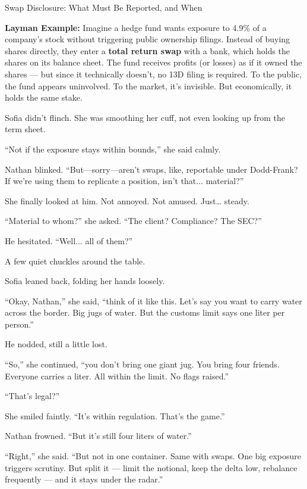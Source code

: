 \begin{TechnicalSidebar}{Swap Disclosure: What Must Be Reported, and When}
    \medskip
    
    \textbf{Layman Example:}  
    Imagine a hedge fund wants exposure to 4.9\% of a company’s stock without triggering public ownership filings.  
    Instead of buying shares directly, they enter a \textbf{total return swap} with a bank, which holds the shares 
    on its balance sheet.  
    The fund receives profits (or losses) as if it owned the shares — but since it technically doesn’t, no 13D 
    filing is required.  
    To the public, the fund appears uninvolved.  
    To the market, it's invisible.  
    But economically, it holds the same stake.
    
\end{TechnicalSidebar}

\medskip

Sofia didn’t flinch. She was smoothing her cuff, not even looking up from the term sheet.

“Not if the exposure stays within bounds,” she said calmly.

Nathan blinked. “But—sorry—aren’t swaps, like, reportable under Dodd-Frank? If we’re using them to 
replicate a position, isn’t that... material?”

She finally looked at him. Not annoyed. Not amused. Just… steady.

“Material to whom?” she asked. “The client? Compliance? The SEC?”

He hesitated. “Well... all of them?”

A few quiet chuckles around the table.

Sofia leaned back, folding her hands loosely.

“Okay, Nathan,” she said, “think of it like this. Let’s say you want to carry water across the border. 
Big jugs of water. But the customs limit says one liter per person.”

He nodded, still a little lost.

“So,” she continued, “you don’t bring one giant jug. You bring four friends. Everyone carries a liter. 
All within the limit. No flags raised.”

“That’s legal?”

She smiled faintly. “It’s within regulation. That’s the game.”

Nathan frowned. “But it’s still four liters of water.”

“Right,” she said. “But not in one container. Same with swaps. One big exposure triggers scrutiny. 
But split it — limit the notional, keep the delta low, rebalance frequently — and it stays under the 
radar.”

